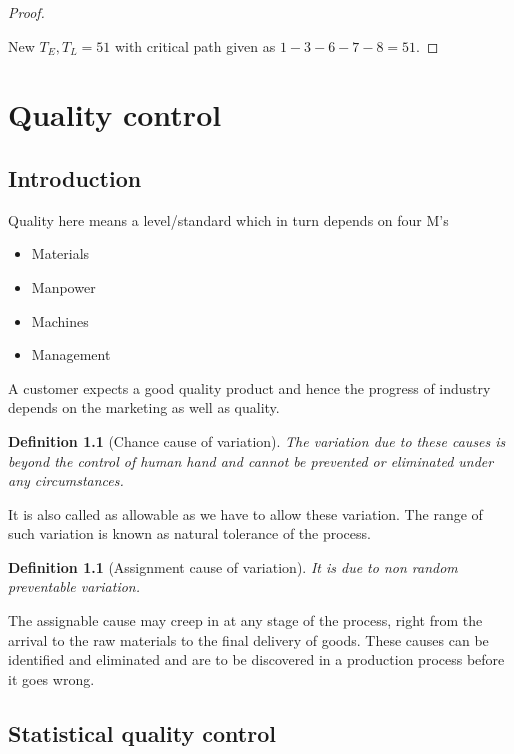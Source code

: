 \documentclass[oneside,11pt,pdftex]{book}%
\numberwithin{equation}{section}
\newtheorem{definition}[theorem]{Definition}
\numberwithin{section}{chapter}
\numberwithin{equation}{chapter}
\begin{document}
\begin{proof}
\begin{center}
\begin{tikzpicture}[x=0.75pt,y=0.75pt,yscale=-1,xscale=1]
		
	\end{tikzpicture}
	
\end{center}
New $ T_E,T_L=51 $ with critical path given as $ 1-3-6-7-8=51$.
\end{proof}



\chapter{Quality control}
\section{Introduction}
Quality here means a level/standard which in turn depends on four M's
\begin{itemize}
	\item Materials
	\item Manpower
	\item Machines
	\item Management
\end{itemize}

A customer expects a good quality product and hence the progress of industry depends on the marketing as well as quality.

\begin{definition}[Chance cause of variation]
	The variation due to these causes is beyond the control of human hand and cannot be prevented or eliminated under any circumstances. 
\end{definition}
It is also called as allowable as we have to allow these variation. The range of such variation is known as natural tolerance of the process.
\begin{definition}[Assignment cause of variation]
	It is due to non random preventable variation. 
\end{definition}
The assignable cause may creep in at any stage of the process, right from the arrival to the raw materials to the final delivery of goods. These causes can be identified and eliminated and are to be discovered in a production process before it goes wrong.

\section{Statistical quality control}
\end{document}

